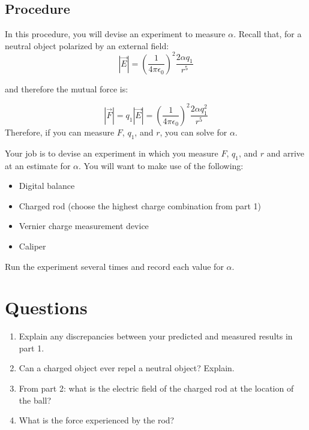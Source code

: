 \documentclass{article}
\begin{document}
\subsection*{Procedure}
In this procedure, you will devise an experiment to measure $\alpha$. Recall that, for a neutral object polarized by an external field:
\begin{equation}
|\vec{E}|=\left(\frac{1}{4\pi\epsilon_0}\right)^2\frac{2\alpha q_1}{r^5}
\end{equation}

and therefore the mutual force is:

\begin{equation}
|\vec{F}|=q_1|\vec{E}|=\left(\frac{1}{4\pi\epsilon_0}\right)^2\frac{2\alpha q_1^2}{r^5}
\end{equation}
Therefore, if you can measure $F$, $q_1$, and $r$, you can solve for $\alpha$.

Your job is to devise an experiment in which you measure $F$, $q_1$, and $r$ and arrive at an estimate for $\alpha$. You will want to make use of the following:
\begin{itemize}
	\item Digital balance
	\item Charged rod (choose the highest charge combination from part 1)
	\item Vernier charge measurement device
	\item Caliper
\end{itemize}

Run the experiment several times and record each value for $\alpha$.

\section*{Questions}
\begin{enumerate}
	\item Explain any discrepancies between your predicted and measured results in part 1.
	\item Can a charged object ever repel a neutral object? Explain.
	\item From part 2: what is the electric field of the charged rod at the location of the ball?
	\item What is the force experienced by the rod?
\end{enumerate}
\end{document}
